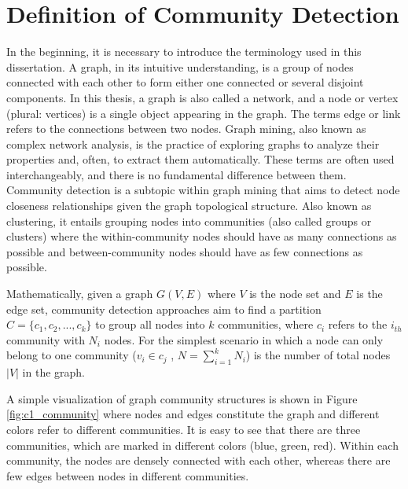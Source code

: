 \section{Definition of Community Detection}
In the beginning, it is necessary to introduce the terminology used in this dissertation. A graph, in its intuitive understanding, is a group of nodes connected with each other to form either one connected or several disjoint components. In this thesis, a graph is also called a network, and a node or vertex (plural: vertices) is a single object appearing in the graph. The terms edge or link refers to the connections between two nodes. Graph mining, also known as complex network analysis, is the practice of exploring graphs to analyze their properties and, often, to extract them automatically. These terms are often used interchangeably, and there is no fundamental difference between them. Community detection is a subtopic within graph mining that aims to detect node closeness relationships given the graph topological structure. Also known as clustering, it entails grouping nodes into communities (also called groups or clusters) where the within-community nodes should have as many connections as possible and between-community nodes should have as few connections as possible.

Mathematically, given a graph $G(V,E)$ where $V$ is the node set and $E$ is the edge set, community detection approaches aim to find a partition $C = \{c_1,c_2,...,c_k\}$ to group all nodes into $k$ communities, where $c_i$ refers to the $i_{th}$ community with $N_i$ nodes. For the simplest scenario in which a node can only belong to one community ($v_i \in c_j$ , $N = \sum_{i=1}^k N_i$) is the number of total nodes  $|V|$ in the graph. 

A simple visualization of graph community structures is shown in Figure \ref{fig:c1_community} where nodes and edges constitute the graph and different colors refer to different communities. It is easy to see that there are three communities, which are marked in different colors (blue, green, red). Within each community, the nodes are densely connected with each other, whereas there are few edges between nodes in different communities.

